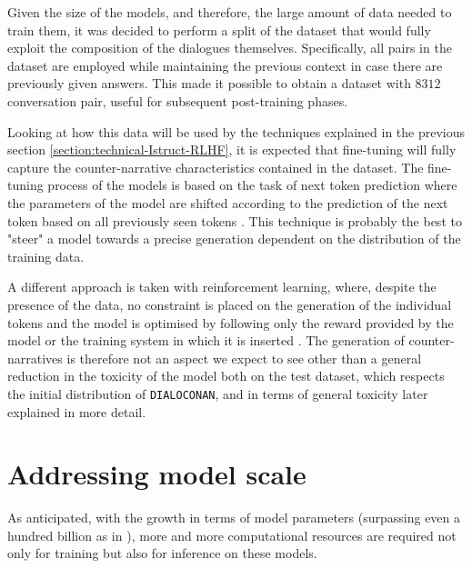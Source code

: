 Given the size of the models, and therefore, the large amount of data needed to train them, it was decided to perform a split of the dataset that would fully exploit the composition of the dialogues themselves. Specifically, all pairs in the dataset are employed while maintaining the previous context in case there are previously given answers. This made it possible to obtain a dataset with $8312$ conversation pair, useful for subsequent post-training phases.

Looking at how this data will be used by the techniques explained in the previous section \ref{section:technical-Istruct-RLHF}, it is expected that fine-tuning will fully capture the counter-narrative characteristics contained in the dataset. The fine-tuning process of the models is based on the task of next token prediction \citep{DBLP:journals/corr/VaswaniSPUJGKP17} where the parameters of the model are shifted according to the prediction of the next token based on all previously seen tokens \citep{solaiman-christy-2021-palms,zhou-etal-2023-lima}. This technique is probably the best to "steer" a model towards a precise generation dependent on the distribution of the training data.

A different approach is taken with reinforcement learning, where, despite the presence of the data, no constraint is placed on the generation of the individual tokens and the model is optimised by following only the reward provided by the model or the training system in which it is inserted \citep{schulman2017proximal}. The generation of counter-narratives is therefore not an aspect we expect to see other than a general reduction in the toxicity of the model both on the test dataset, which respects the initial distribution of \texttt{DIALOCONAN}, and in terms of general toxicity later explained in more detail.





\section {Addressing model scale}
\label{chapter:model-scale}

As anticipated, with the growth in terms of model parameters (surpassing even a hundred billion as in \citet{openai-2023-gpt4}), more and more computational resources are required not only for training but also for inference on these models. 

